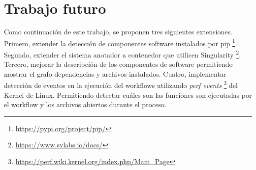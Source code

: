 \section{Trabajo futuro}

Como continuación de este trabajo, se proponen tres siguientes extensiones.
Primero, extender la detección de componentes software instalados por pip \footnote{\url{https://pypi.org/project/pip/}}. 
Segundo, extender el sistema anotador a contenedor que utilicen Singularity \footnote{\url{https://www.sylabs.io/docs/}}.
Tercero, mejorar la descripción de los componentes de software permitiendo mostrar el grafo dependencias y archivos instalados.
Cuatro, implementar detección de eventos en la ejecución del workflows utilizando \emph{perf events} \footnote{\url{https://perf.wiki.kernel.org/index.php/Main_Page}} del Kernel de Linux.
Permitiendo detectar cuáles son las funciones son ejecutadas por el workflow y los archivos abiertos durante el proceso.




